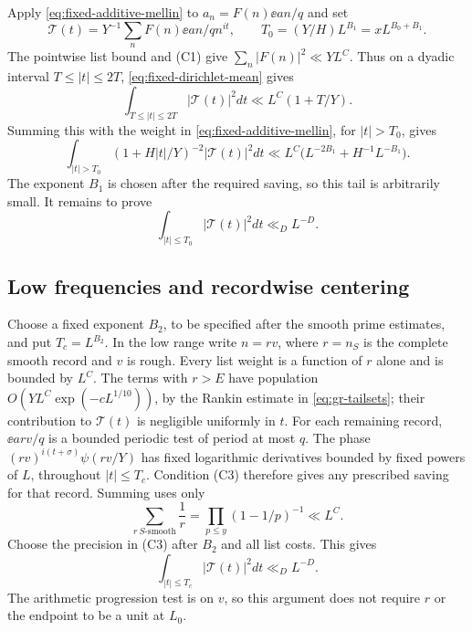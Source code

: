 Apply \eqref{eq:fixed-additive-mellin} to
\(a_n=F(n)\ee{an/q}\) and set
\[
 \mathcal T(t)=Y^{-1}\sum_nF(n)\ee{an/q}n^{it},\qquad
 T_0=(Y/H)L^{B_1}=xL^{B_0+B_1}.
\]
The pointwise list bound and \textup{(C1)} give
\(\sum_n|F(n)|^2\ll YL^C\). Thus on a dyadic interval
\(T\le |t|\le2T\), \eqref{eq:fixed-dirichlet-mean} gives
\[
 \int_{T\le|t|\le2T}|\mathcal T(t)|^2dt
                                  \ll L^C(1+T/Y).
\]
Summing this with the weight in
\eqref{eq:fixed-additive-mellin}, for \(|t|>T_0\), gives
\begin{equation}\label{eq:fixed-frequency-tail}
 \int_{|t|>T_0}(1+H|t|/Y)^{-2}|\mathcal T(t)|^2dt
       \ll L^C\bigl(L^{-2B_1}+H^{-1}L^{-B_1}\bigr).
\end{equation}
The exponent \(B_1\) is chosen after the required saving, so this
tail is arbitrarily small. It remains to prove
\begin{equation}\label{eq:fixed-dirichlet-energy}
                \int_{|t|\le T_0}|\mathcal T(t)|^2dt\ll_D L^{-D}.
\end{equation}

\subsection{Low frequencies and recordwise centering}

Choose a fixed exponent \(B_2\), to be specified after the smooth
prime estimates, and put \(T_c=L^{B_2}\). In the low range write
\(n=rv\), where \(r=n_S\) is the complete smooth record and
\(v\) is rough. Every list weight is a function of \(r\) alone
and is bounded by \(L^C\). The terms with \(r>E\) have population
\(O(YL^C\exp(-cL^{1/10}))\), by the Rankin estimate in
\eqref{eq:gr-tailsets}; their contribution to \(\mathcal T(t)\)
is negligible uniformly in \(t\). For each remaining record,
\(\ee{arv/q}\) is a bounded periodic test of period at most \(q\).
The phase \((rv)^{i(t+\sigma)}\psi(rv/Y)\) has fixed logarithmic
derivatives bounded by fixed powers of \(L\), throughout
\(|t|\le T_c\). Condition \textup{(C3)} therefore gives any
prescribed saving for that record. Summing uses only
\[
          \sum_{r\ S\text{-smooth}}\frac1r
             =\prod_{p\le y}(1-1/p)^{-1}\ll L^C.
\]
Choose the precision in \textup{(C3)} after \(B_2\) and all list
costs. This gives
\begin{equation}\label{eq:fixed-low}
             \int_{|t|\le T_c}|\mathcal T(t)|^2dt\ll_D L^{-D}.
\end{equation}
The arithmetic progression test is on \(v\), so this argument
does not require \(r\) or the endpoint to be a unit at \(L_0\).

